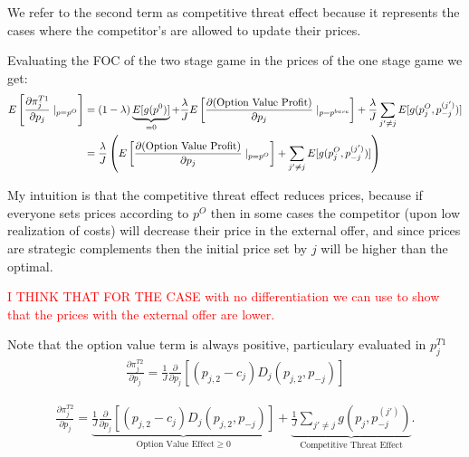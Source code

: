 \documentclass[12pt]{article}
\begin{document}
We refer to the second term as competitive threat effect because it represents the cases where the competitor's are allowed to update their prices. 

Evaluating the FOC of the two stage game in the prices of the one stage game  we get: 
\begin{align}
    E \left[  \frac{\partial \pi_j^{T1}}{\partial p_j} \mid _{p=p^O} \right] & = (1-\lambda) \underbrace{E[g(p^0)]}_{=0} + \frac{\lambda}{J} E \left[  \frac{\partial(\text{Option Value Profit})}{\partial p_j} \mid_{p=p^{base}} \right] + \frac{\lambda}{J} \sum_{j' \ne j} E[g(p_j^{O}, p_{-j}^{(j')})] \notag \\ 
    & =\frac{\lambda}{J} \left( E \left[  \frac{\partial(\text{Option Value Profit})}{\partial p_j} \mid_{p=p^O} \right] +  \sum_{j' \ne j} E[g(p_j^O, p_{-j}^{(j')})] \right)    
\end{align}

My intuition is that the competitive threat effect reduces prices, because if everyone sets prices according to $p^O$ then in some cases the competitor (upon low realization of costs) will decrease their price in the external offer, and since prices are strategic complements then the initial price set by $j$ will be higher than the optimal. 


\textcolor{red}{I THINK THAT FOR THE CASE with no differentiation we can use \textcite{spulber_bertrand_1995} to show that the prices with the external offer are lower. }





\vspace{3cm}


 
Note that the option value term is always positive, particulary evaluated in $p_j^{T1}$
\begin{align}
    \frac{\partial \pi_j^{T2}}{\partial p_j} =\frac{1}{J} \frac{\partial}{\partial p_j} \left[ (p_{j,2} - c_j) D_j(p_{j,2}, p_{-j}) \right]
\end{align}
 
\begin{align}
    \frac{\partial \pi_j^{T2}}{\partial p_j} = \underbrace{\frac{1}{J} \frac{\partial}{\partial p_j} \left[ (p_{j,2} - c_j) D_j(p_{j,2}, p_{-j}) \right]}_{\text{Option Value Effect} \geq 0 } + \underbrace{\frac{1}{J} \sum_{j' \ne j} g(p_j, p_{-j}^{(j')})}_{\text{Competitive Threat Effect}}.
\end{align}
\end{document}
